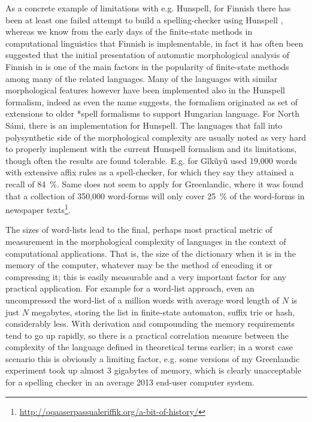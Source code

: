 \documentclass[officiallayout]{unihelcompling}
\begin{document}
As a concrete example of limitations with e.g. Hunspell, for Finnish there has
been at least one failed attempt to build a spelling-checker using Hunspell
\citep{pitkanen2006hunspell}, whereas we know from the early days of the
finite-state methods in computational linguistics that Finnish is
implementable, in fact it has often been suggested that the initial
presentation of automatic morphological analysis of Finnish in
\citet{koskenniemi1983twolevel} is one of the main factors in the popularity of
finite-state methods among many of the related languages. Many of the languages
with similar morphological features however have been implemented also in the
Hunspell formalism, indeed as even the name suggests, the formalism originated
as set of extensions to older *spell formalisms to support Hungarian language.
For North Sámi, there is an implementation for Hunspell. The languages that
fall into polysynthetic side of the morphological complexity are usually noted
as very hard to properly implement with the current Hunspell formalism and its
limitations, though often the results are found tolerable. E.g. for Gĩkũyũ
\citet{chege2010developing} used 19,000 words with extensive affix rules as a
spell-checker, for which they say they attained a recall of 84~\%. Same does
not seem to apply for Greenlandic, where it was found that a collection of
350,000 word-forms will only cover 25~\% of the word-forms in newspaper
texts\footnote{\url{http://oqaaserpassualeriffik.org/a-bit-of-history/}}.

The sizes of word-lists lead to the final, perhaps most practical metric of
measurement in the morphological complexity of languages in the context of
computational applications. That is, the size of the dictionary when it is in
the memory of the computer, whatever may be the method of encoding it or
compressing it; this is easily measurable and a very important factor for any
practical application.  For example for a word-list approach, even an
uncompressed the word-list of a million words with average word length of $N$
is just $N$ megabytes, storing the list in finite-state automaton, suffix trie
or hash, considerably less. With derivation and compounding the memory
requirements tend to go up rapidly, so there is a practical correlation measure
between the complexity of the language defined in theoretical terms earlier; in
a worst case scenario this is obviously a limiting factor, e.g. some versions
of my Greenlandic experiment took up almost 3 gigabytes of memory, which is
clearly unacceptable for a spelling checker in an average 2013 end-user
computer system.
\end{document}
